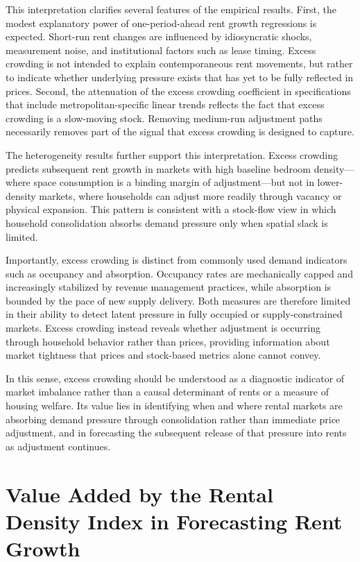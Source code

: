 \documentclass[pdflatex,sn-basic]{sn-jnl}%
\theoremstyle{thmstyleone}%
\theoremstyle{thmstyletwo}%
\theoremstyle{thmstylethree}%
\begin{document}
This interpretation clarifies several features of the empirical results. First, the
modest explanatory power of one-period-ahead rent growth regressions is expected.
Short-run rent changes are influenced by idiosyncratic shocks, measurement noise,
and institutional factors such as lease timing. Excess crowding is not intended to
explain contemporaneous rent movements, but rather to indicate whether underlying
pressure exists that has yet to be fully reflected in prices. Second, the attenuation of
the excess crowding coefficient in specifications that include metropolitan-specific
linear trends reflects the fact that excess crowding is a slow-moving stock. Removing
medium-run adjustment paths necessarily removes part of the signal that excess
crowding is designed to capture.

The heterogeneity results further support this interpretation. Excess crowding predicts
subsequent rent growth in markets with high baseline bedroom density—where space
consumption is a binding margin of adjustment—but not in lower-density markets,
where households can adjust more readily through vacancy or physical expansion.
This pattern is consistent with a stock-flow view in which household consolidation
absorbs demand pressure only when spatial slack is limited.

Importantly, excess crowding is distinct from commonly used demand indicators such
as occupancy and absorption. Occupancy rates are mechanically capped and increasingly
stabilized by revenue management practices, while absorption is bounded by the pace
of new supply delivery. Both measures are therefore limited in their ability to detect
latent pressure in fully occupied or supply-constrained markets. Excess crowding
instead reveals whether adjustment is occurring through household behavior rather
than prices, providing information about market tightness that prices and stock-based
metrics alone cannot convey.

In this sense, excess crowding should be understood as a diagnostic indicator of
market imbalance rather than a causal determinant of rents or a measure of housing
welfare. Its value lies in identifying when and where rental markets are absorbing
demand pressure through consolidation rather than immediate price adjustment, and
in forecasting the subsequent release of that pressure into rents as adjustment
continues.

\section{Value Added by the Rental Density Index in Forecasting Rent Growth}\label{section5}
\end{document}
